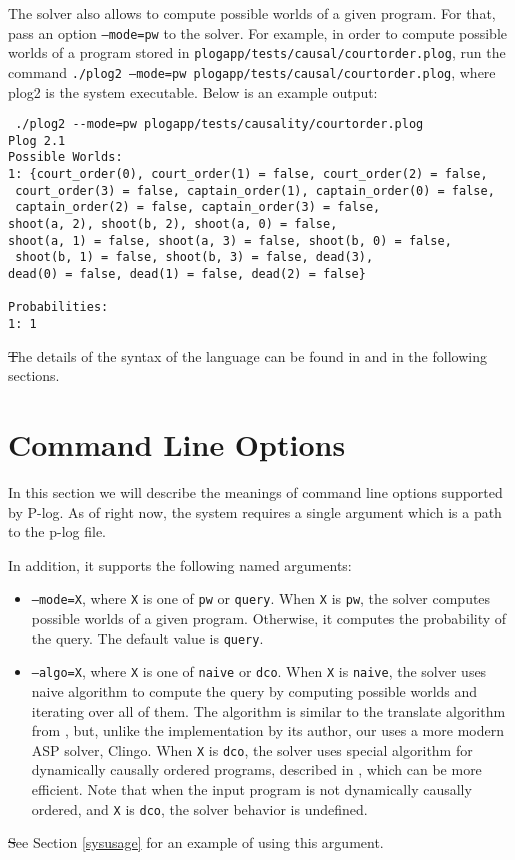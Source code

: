 \documentclass[12pt, letterpaper]{article}
\begin{document}
The solver also allows to compute possible worlds of a given program. For that, pass an option  \texttt{--mode=pw} to the solver.
For example, in order to compute possible worlds of a program stored in \texttt{plogapp/tests/causal/courtorder.plog}, run the command
\texttt{./plog2 --mode=pw  plogapp/tests/causal/courtorder.plog}, where plog2 is the system executable.
Below is an example output:
\begin{verbatim}
 ./plog2 --mode=pw plogapp/tests/causality/courtorder.plog 
Plog 2.1
Possible Worlds:
1: {court_order(0), court_order(1) = false, court_order(2) = false,
 court_order(3) = false, captain_order(1), captain_order(0) = false,
 captain_order(2) = false, captain_order(3) = false, 
shoot(a, 2), shoot(b, 2), shoot(a, 0) = false, 
shoot(a, 1) = false, shoot(a, 3) = false, shoot(b, 0) = false,
 shoot(b, 1) = false, shoot(b, 3) = false, dead(3), 
dead(0) = false, dead(1) = false, dead(2) = false}

Probabilities:
1: 1
\end{verbatim}
\st
The details of the syntax of the language can be found in \cite{Balai2019} and in the following sections. 

\section{Command Line Options}\label{option}

In this section we will describe the meanings of command line options supported by
P-log. As of right now, the system requires  a single argument which is a path to the p-log file.

\medskip\noindent
In addition, it supports the following named arguments:
\begin{itemize}
\item \texttt{--mode=X}, where \texttt{X} is one of \texttt{pw} or \texttt{query}. When \texttt{X} is \texttt{pw}, the solver computes possible worlds of a given program. Otherwise, it computes the probability of the query. The default value is \texttt{query}.
\end{itemize}

  \begin{itemize}
  \item \texttt{--algo=X}, where \texttt{X} is one of \texttt{naive} or \texttt{dco}. When \texttt{X} is \texttt{naive}, the solver uses naive algorithm to compute the query by computing possible worlds and iterating over all of them. The algorithm is similar to the translate algorithm from \cite{zhu2012plog}, but, unlike the implementation by its author, our uses a more modern ASP solver, Clingo. When \texttt{X} is \texttt{dco}, the solver uses special algorithm for dynamically causally ordered programs, described in \cite{balai2017investigating}, which can be more efficient. Note that when the input program is not dynamically causally ordered, and \texttt{X} is \texttt{dco}, the solver behavior is undefined. 
\end{itemize}
\st
See Section \ref{sysusage} for an example of using this argument.
\end{document}

